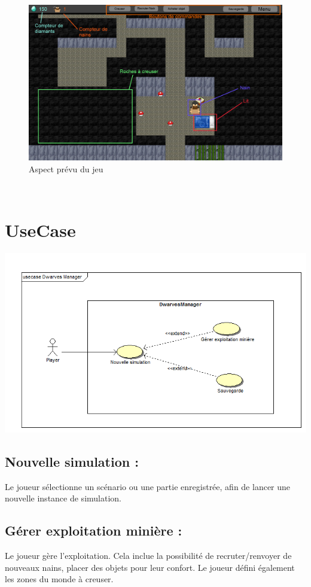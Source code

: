 \documentclass[a4paper]{report}
\begin{document}
\begin{figure}[bh!]
    \center
    \includegraphics[width=15cm]{img/divers/visu}
    \caption{Aspect prévu du jeu}
\end{figure}
~
\newpage

\chapter*{UseCase}

\begin{center}\includegraphics[scale=0.5]{img/spec/usecase}\end{center}

\section*{Nouvelle simulation :}
Le joueur sélectionne un scénario ou une partie enregistrée, afin de lancer une 	nouvelle instance de simulation.

\section*{Gérer exploitation minière :}
Le joueur gère l'exploitation.
Cela inclue la possibilité de recruter/renvoyer de nouveaux nains, placer des 	objets pour leur confort. 
Le joueur défini également les zones du monde à creuser.
\end{document}
